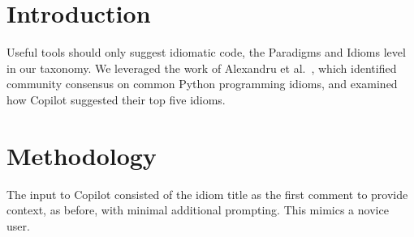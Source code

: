 \label{chapter:idioms}

\section{Introduction}
Useful \AISE{} tools should only suggest idiomatic code, the Paradigms and Idioms level in our taxonomy.  
We leveraged the work of Alexandru et al.~\cite{Alexandru2018}, which identified community consensus on common Python programming idioms, and examined how Copilot suggested their top five idioms.


\section{Methodology}
The input to Copilot consisted of the idiom title as the first comment to provide context, as before, with minimal additional prompting. This mimics a novice user. 




